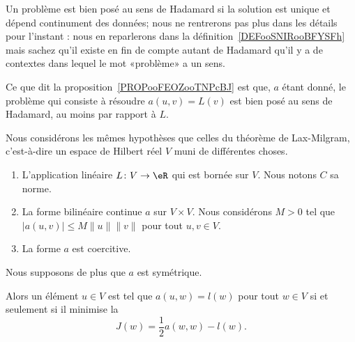 Un problème est bien posé au sens de Hadamard si la solution est unique et dépend continument des données; nous ne rentrerons pas plus dans les détails pour l'instant : nous en reparlerons dans la définition~\ref{DEFooSNIRooBFYSFh} mais sachez qu'il existe en fin de compte autant de Hadamard qu'il y a de contextes dans lequel le mot «problème» a un sens.

Ce que dit la proposition~\ref{PROPooFEOZooTNPcBJ} est que, \( a\) étant donné, le problème qui consiste à résoudre \( a(u,v)=L(v)\) est bien posé au sens de Hadamard, au moins par rapport à \( L\).

\begin{theorem}
	Nous considérons les mêmes hypothèses que celles du théorème de Lax-Milgram, c'est-à-dire un espace de Hilbert réel \( V\) muni de différentes choses.
	\begin{enumerate}
		\item
		      L'application linéaire \( L\colon V\to \eR\) qui est bornée sur \( V\). Nous notons \( C\) sa norme.
		\item
		      La forme bilinéaire continue \( a\) sur \( V\times V\). Nous considérons \( M>0\) tel que \( | a(u,v) |\leq M\| u \|\| v \|\) pour tout \( u,v\in V\).
		\item
		      La forme \( a\) est coercitive.
	\end{enumerate}
	Nous supposons de plus que \( a\) est symétrique.

	Alors un élément \( u\in V\) est tel que \( a(u,w)=l(w)\) pour tout \( w\in V\) si et seulement si il minimise la 
	\begin{equation}
		J(w)=\frac{ 1 }{2}a(w,w)-l(w).
	\end{equation}
\end{theorem}

